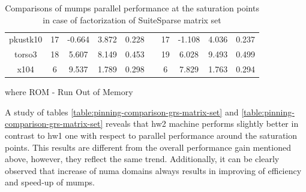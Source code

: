 \begin{table}[htpb]
\begin{tabular}{c|c|c|c|c|c|c|c|c|c|}
\multicolumn{1}{|c|}{pkustk10}                                              & 17  & -0.664                                                                & 3.872                                              & 0.228                                                  &  & 17  & -1.108                                                                & 4.036                                              & 0.237                                                  \\ \cline{1-5} \cline{7-10} 
\multicolumn{1}{|c|}{torso3}                                                & 18  & 5.607                                                                 & 8.149                                              & 0.453                                                  &  & 19  & 6.028                                                                 & 9.493                                              & 0.499                                                  \\ \cline{1-5} \cline{7-10} 
\multicolumn{1}{|c|}{x104}                                                  & 6   & 9.537                                                                 & 1.789                                              & 0.298                                                  &  & 6   & 7.829                                                                 & 1.763                                              & 0.294                                                  \\ \cline{1-5} \cline{7-10} 
\end{tabular}
\caption{Comparisons of \gls{mumps} parallel performance at the saturation points in case of factorization of SuiteSparse matrix set}
where ROM - Run Out of Memory
\label{table:pinning-comparison-suitesparse-matrix-set}
\end{table}


A study of tables \ref{table:pinning-comparison-grs-matrix-set} and \ref{table:pinning-comparison-grs-matrix-set} reveals that \gls{hw2} machine performs slightly better in contrast to \gls{hw1} one with respect to parallel performance around the saturation points. This results are different from the overall performance gain mentioned above, however, they reflect the same trend. Additionally, it can be clearly observed that increase of \gls{numa} domains always results in improving of efficiency and speed-up of \gls{mumps}.\\


